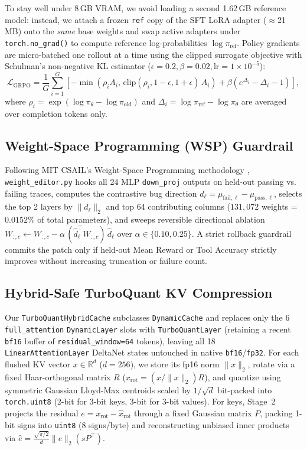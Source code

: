 \documentclass[10pt,letterpaper]{article}
\begin{document}
To stay well under 8\,GB VRAM, we avoid loading a second 1.62\,GB reference model: instead, we attach a frozen \texttt{ref} copy of the SFT LoRA adapter ($\approx$21\,MB) onto the \textit{same} base weights and swap active adapters under \texttt{torch.no\_grad()} to compute reference log-probabilities $\log \pi_{\text{ref}}$. Policy gradients are micro-batched one rollout at a time using the clipped surrogate objective with Schulman's non-negative KL estimator ($\epsilon=0.2, \beta=0.02, \text{lr}=1\times10^{-5}$):
\begin{equation}
    \mathcal{L}_{\text{GRPO}} = \frac{1}{G} \sum_{i=1}^{G} \left[ -\min\!\left(\rho_i A_i,\, \text{clip}(\rho_i, 1-\epsilon, 1+\epsilon)\,A_i\right) + \beta \left(e^{\Delta_i} - \Delta_i - 1\right) \right],
    \label{eq:grpo}
\end{equation}
where $\rho_i = \exp(\log \pi_\theta - \log \pi_{\text{old}})$ and $\Delta_i = \log \pi_{\text{ref}} - \log \pi_\theta$ are averaged over completion tokens only.

\subsection{Weight-Space Programming (WSP) Guardrail}
Following MIT CSAIL's Weight-Space Programming methodology \cite{wsp}, \texttt{weight\_editor.py} hooks all 24 MLP \texttt{down\_proj} outputs on held-out passing vs. failing traces, computes the contrastive bug direction $d_{\ell} = \mu_{\text{fail},\ell} - \mu_{\text{pass},\ell}$, selects the top 2 layers by $\|d_\ell\|_2$ and top 64 contributing columns ($131{,}072$ weights = $0.0152\%$ of total parameters), and sweeps reversible directional ablation $W_{:,c} \leftarrow W_{:,c} - \alpha\,(\hat{d}_\ell^\top W_{:,c})\,\hat{d}_\ell$ over $\alpha \in \{0.10, 0.25\}$. A strict rollback guardrail commits the patch only if held-out Mean Reward or Tool Accuracy strictly improves without increasing truncation or failure count.

\subsection{Hybrid-Safe TurboQuant KV Compression}
Our \texttt{TurboQuantHybridCache} subclasses \texttt{DynamicCache} and replaces only the 6 \texttt{full\_attention} \texttt{DynamicLayer} slots with \texttt{TurboQuantLayer} (retaining a recent \texttt{bf16} buffer of \texttt{residual\_window=64} tokens), leaving all 18 \texttt{LinearAttentionLayer} DeltaNet states untouched in native \texttt{bf16}/\texttt{fp32}. For each flushed KV vector $x \in \mathbb{R}^d$ ($d=256$), we store its fp16 norm $\|x\|_2$, rotate via a fixed Haar-orthogonal matrix $R$ ($x_{\text{rot}} = (x / \|x\|_2) R$), and quantize using symmetric Gaussian Lloyd-Max centroids scaled by $1/\sqrt{d}$ bit-packed into \texttt{torch.uint8} (2-bit for 3-bit keys, 3-bit for 3-bit values). For keys, Stage~2 projects the residual $e = x_{\text{rot}} - \hat{x}_{\text{rot}}$ through a fixed Gaussian matrix $P$, packing 1-bit signs into \texttt{uint8} (8 signs/byte) and reconstructing unbiased inner products via $\hat{e} = \frac{\sqrt{\pi/2}}{d}\|e\|_2 (s P^\top)$.
\end{document}
